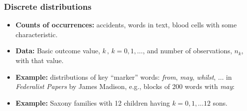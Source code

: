\renewcommand{\FileName}{discrete}
\begin{comment}
\begin{frame}
  \frametitle{Discrete distributions}  
  \begin{itemize}
	\item {\large\bfseries Counts of occurrences:} accidents, words in text, 
	blood cells with some characteristic.
	\item{\large\bfseries Data:} Basic outcome value, \(k \,  , \,  k = 0 , 1, \dots\),
	and number of observations, \(n_k\), with that value.
	\item {\large\bfseries Example:} \emph{Federalist Papers}--- disputed authorship 
      \begin{itemize*}
	  \item 77 essays by Hamilton, Jay \& Madison: persuade NY voters to ratify Constitution, all
	  signed with pseudonym (``Publius'')
	  \item 65 known, 12 disputed (H \& M both claimed sole authorship)
	  \item \citet{MostellerWallace:84}: Analysis of frequency distributions of key ``marker'' words:
\emph{from}, \emph{may}, \emph{whilst}, $\dots$.
	  \item For each word, fit probability model (Poisson, NegBin)
$\rightarrow (\beta_1, \beta_2, \cdots) \longrightarrow $
log Odds (Hamilton vs. Madison)
	  \end{itemize*}
  \end{itemize}

  
\end{frame}
\end{comment}

\begin{frame}
  \frametitle{Discrete distributions}  
  \begin{itemize}
	\item {\large\bfseries Counts of occurrences:} accidents, words in text, 
	blood cells with some characteristic.
	\item{\large\bfseries Data:} Basic outcome value, \(k \,  , \,  k = 0 , 1, \dots\),
	and number of observations, \(n_k\), with that value.
	\item {\large\bfseries Example:} distributions of key ``marker''
	words: \emph{from}, \emph{may}, \emph{whilst}, $\dots$ in \emph{Federalist Papers}
	by James Madison, e.g., blocks of 200 words with  \emph{may}:

  

	\item {\large\bfseries Example:} Saxony
	families with 12 children having $k=0, 1, \dots 12$ sons.
  \end{itemize}
	

\end{frame}

